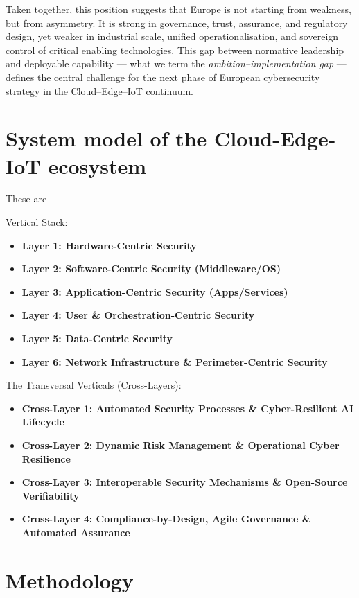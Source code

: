 \documentclass{ieeeaccess}
\begin{document}
Taken together, this position suggests that Europe is not starting from
weakness, but from asymmetry. It is strong in governance, trust,
assurance, and regulatory design, yet weaker in industrial scale,
unified operationalisation, and sovereign control of critical enabling
technologies. This gap between normative leadership and deployable
capability --- what we term the \emph{ambition--implementation gap} ---
defines the central challenge for the next phase of European
cybersecurity strategy in the Cloud--Edge--IoT continuum.

\section{System model of the Cloud-Edge-IoT
ecosystem}\label{system-model-of-the-cloud-edge-iot-ecosystem}

These are

Vertical Stack:

\begin{itemize}
\item
  \textbf{Layer 1: Hardware-Centric Security}
\item
  \textbf{Layer 2: Software-Centric Security (Middleware/OS)}
\item
  \textbf{Layer 3: Application-Centric Security (Apps/Services)}
\item
  \textbf{Layer 4: User \& Orchestration-Centric Security}
\item
  \textbf{Layer 5: Data-Centric Security}
\item
  \textbf{Layer 6: Network Infrastructure \& Perimeter-Centric Security}
\end{itemize}

The Transversal Verticals (Cross-Layers):

\begin{itemize}
\item
  \textbf{Cross-Layer 1: Automated Security Processes \& Cyber-Resilient
  AI Lifecycle}
\item
  \textbf{Cross-Layer 2: Dynamic Risk Management \& Operational Cyber
  Resilience}
\item
  \textbf{Cross-Layer 3: Interoperable Security Mechanisms \&
  Open-Source Verifiability}
\item
  \textbf{Cross-Layer 4: Compliance-by-Design, Agile Governance \&
  Automated Assurance}
\end{itemize}

\section{Methodology}\label{methodology}
\end{document}
